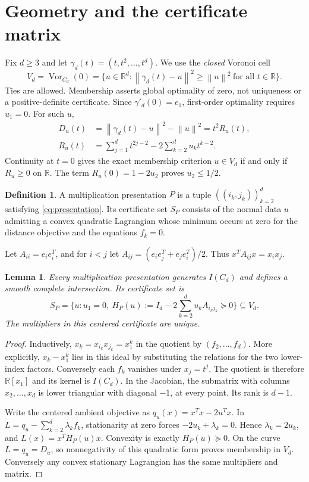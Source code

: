 \documentclass[11pt]{article}
\newtheorem{lemma}[theorem]{Lemma}
\theoremstyle{definition}\newtheorem{definition}[theorem]{Definition}
\theoremstyle{remark}\newtheorem{remark}[theorem]{Remark}
\newcommand{\R}{\mathbb{R}}
\newcommand{\Vor}{\operatorname{Vor}}
\newcommand{\norm}[1]{\left\lVert#1\right\rVert}
\begin{document}
\section{Geometry and the certificate matrix}\label{sec:setup}
Fix $d\ge3$ and let $\gamma_d(t)=(t,t^2,\ldots,t^d)$. We use the \emph{closed} Voronoi cell
\begin{equation}\label{eq:vor}
 V_d=\Vor_{C_d}(0)=\{u\in\R^d:\norm{\gamma_d(t)-u}^2\ge\norm{u}^2\ \text{for all }t\in\R\}.
\end{equation}
Ties are allowed. Membership asserts global optimality of zero, not uniqueness or a positive-definite certificate. Since $\gamma'_d(0)=e_1$, first-order optimality requires $u_1=0$. For such $u$,
\begin{align}
 D_u(t)&=\norm{\gamma_d(t)-u}^2-\norm{u}^2=t^2R_u(t),\label{eq:D}\\
 R_u(t)&=\sum_{j=1}^d t^{2j-2}-2\sum_{k=2}^d u_kt^{k-2}.\label{eq:R}
\end{align}
Continuity at $t=0$ gives the exact membership criterion $u\in V_d$ if and only if $R_u\ge0$ on $\R$. The term $R_u(0)=1-2u_2$ proves $u_2\le1/2$.

\begin{definition}
A multiplication presentation $P$ is a tuple $((i_k,j_k))_{k=2}^d$ satisfying \eqref{eq:presentation}. Its certificate set $S_P$ consists of the normal data $u$ admitting a convex quadratic Lagrangian whose minimum occurs at zero for the distance objective and the equations $f_k=0$.
\end{definition}

Let $A_{ii}=e_ie_i^T$, and for $i<j$ let $A_{ij}=(e_ie_j^T+e_je_i^T)/2$. Thus $x^TA_{ij}x=x_ix_j$.

\begin{lemma}\label{lem:matrix}
Every multiplication presentation generates $I(C_d)$ and defines a smooth complete intersection. Its certificate set is
\begin{equation}\label{eq:H}
 S_P=\{u:u_1=0,\ H_P(u):=I_d-2\sum_{k=2}^d u_k A_{i_kj_k}\succeq0\}\subseteq V_d.
\end{equation}
The multipliers in this centered certificate are unique.
\end{lemma}
\begin{proof}
Inductively, $x_k=x_{i_k}x_{j_k}=x_1^k$ in the quotient by $(f_2,\ldots,f_d)$. More explicitly, $x_k-x_1^k$ lies in this ideal by substituting the relations for the two lower-index factors. Conversely each $f_k$ vanishes under $x_j=t^j$. The quotient is therefore $\R[x_1]$ and its kernel is $I(C_d)$. In the Jacobian, the submatrix with columns $x_2,\ldots,x_d$ is lower triangular with diagonal $-1$, at every point. Its rank is $d-1$.

Write the centered ambient objective as $q_u(x)=x^Tx-2u^Tx$. In $L=q_u-\sum_{k=2}^d\lambda_k f_k$, stationarity at zero forces $-2u_k+\lambda_k=0$. Hence $\lambda_k=2u_k$, and $L(x)=x^TH_P(u)x$. Convexity is exactly $H_P(u)\succeq0$. On the curve $L=q_u=D_u$, so nonnegativity of this quadratic form proves membership in $V_d$. Conversely any convex stationary Lagrangian has the same multipliers and matrix.
\end{proof}
\end{document}
